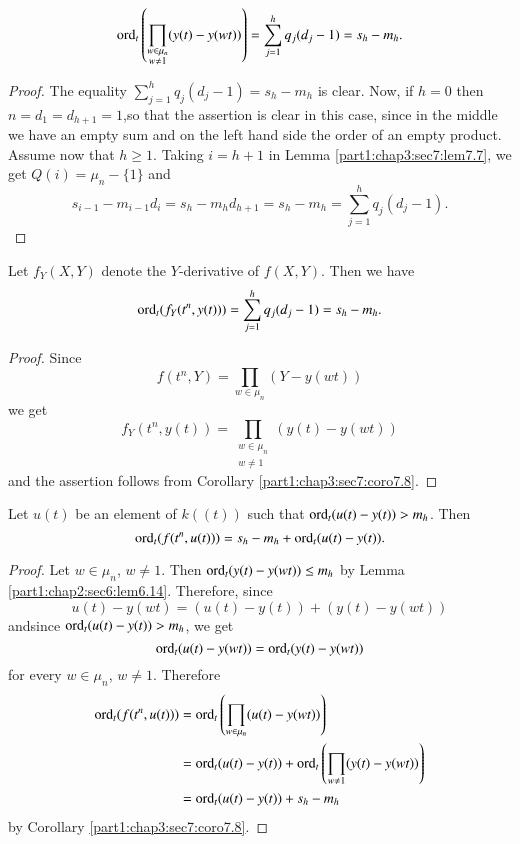 \begin{coro}\label{part1:chap3:sec7:coro7.8}
  $$
  \operatorname{ord}_t \left( \prod_{\substack{w \in \mu_n\\w \neq 1}} (y(t)- y(wt)) \right) = \sum^h_{j=1} q_j (d_j-1) = s_h - m_h.
  $$
\end{coro}

\begin{proof}
  The equality $\displaystyle{\sum^h_{j=1} q_j (d_j -1)=s_h - m_h}$ is clear. Now, if $h=0$ then $n= d_1 = d_{h+1}=1$,\pageoriginale so that the assertion is clear in this case, since in the middle we have an empty sum and on the left hand side the order of an empty product. Assume now that $h \geq 1$. Taking $i = h+1$ in Lemma \ref{part1:chap3:sec7:lem7.7}, we get $Q(i) =\mu_n - \{1\}$ and 
$$
s_{i-1} - m_{i-1} d_i = s_h - m_h d_{h+1}= s_h - m_h= \sum^h_{j=1}q_j (d_j-1).
$$
\end{proof}

\begin{coro}\label{part1:chap3:sec7:coro7.9}
  Let $f_Y (X, Y)$ denote the $Y$-derivative of $f(X, Y)$. Then we have
  $$
  \operatorname{ord}_t(f_Y(t^n, y(t))) = \sum^h_{j=1} q_j (d_j-1) = s_h - m_h. 
  $$
\end{coro}

\begin{proof}
  Since
$$
f(t^n, Y) = \prod_{w \in \mu_n} (Y- y(wt))
$$
we get
$$
f_Y (t^n, y(t)) = \prod_{\substack{w \in \mu_n\\w \neq 1}} (y(t) - y(wt))
$$
and the assertion follows from Corollary \ref{part1:chap3:sec7:coro7.8}.
\end{proof}

\begin{coro}\label{part1:chap3:sec7:coro7.10}
  Let $u(t)$ be an element of $k((t))$ such that $\ord_t\break (u(t)- y(t))> m_h$. Then
$$
\operatorname{ord}_t (f(t^n, u(t)))= s_h - m_h+ \operatorname{ord}_t (u (t)- y(t)).
$$
\end{coro}

\begin{proof}
  Let $w \in \mu_n$, $w \neq 1$. Then $\operatorname{ord}_t(y(t)- y(wt))\leq m_h$ by Lemma \ref{part1:chap2:sec6:lem6.14}. Therefore, since
$$
u(t) - y(wt) = (u(t) - y(t)) + (y(t)- y(wt))
$$
and\pageoriginale since $\operatorname{ord}_t (u(t)- y(t))> m_h$, we get
$$
\operatorname{ord}_t (u(t) - y(wt))= \operatorname{ord}_t (y(t)- y(wt))
$$
for every $w \in \mu_n$, $w \neq 1$. Therefore
\begin{align*}
  \operatorname{ord}_t (f(t^n, u(t))) & = \operatorname{ord}_{t} \left(\prod_{w \in \mu_n} (u(t)- y(wt)) \right)\\
  & = \operatorname{ord}_t (u (t)- y (t))+ \operatorname{ord}_t \left( \prod_{w \neq 1} (y(t)- y (wt))\right)\\
& = \operatorname{ord}_t (u (t) - y(t)) + s_h - m_h
\end{align*}
by Corollary \ref{part1:chap3:sec7:coro7.8}.
\end{proof}

